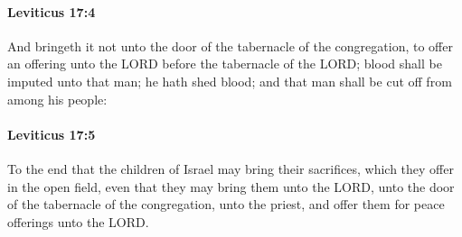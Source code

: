 		\paragraph{Leviticus 17:4} %
			\label{LEVITICUS-17-4}

			And bringeth it not unto the door of the tabernacle of the congregation, to offer an offering unto the LORD before the tabernacle of the LORD; blood shall be imputed unto that man; he hath shed blood; and that man shall be cut off from among his people:


		\paragraph{Leviticus 17:5} %
			\label{LEVITICUS-17-5}

			To the end that the children of Israel may bring their sacrifices, which they offer in the open field, even that they may bring them unto the LORD, unto the door of the tabernacle of the congregation, unto the priest, and offer them for peace offerings unto the LORD.


